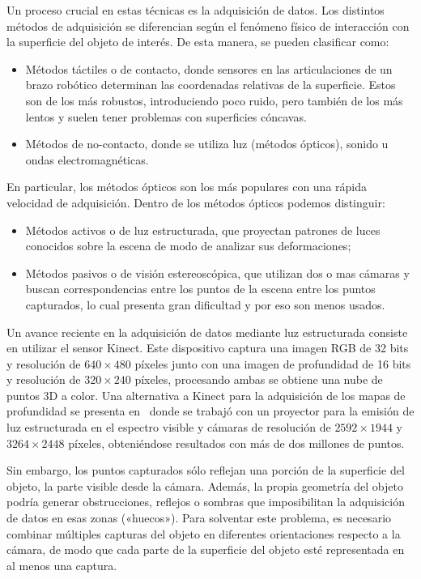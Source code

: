 	Un proceso crucial en estas técnicas es la adquisición de datos.
	Los distintos métodos de adquisición se diferencian según el fenómeno físico de interacción con la superficie del objeto de interés.
	De esta manera, se pueden clasificar como:
	\begin{itemize}
		\item Métodos táctiles o de contacto, donde sensores en las articulaciones de un brazo robótico determinan las coordenadas relativas de la superficie. Estos son de los más robustos, introduciendo poco ruido, pero también de los más lentos y suelen tener problemas con superficies cóncavas.
		\item Métodos de no-contacto, donde se utiliza luz (métodos ópticos), sonido u ondas electromagnéticas.
	\end{itemize}
	En particular, los métodos ópticos son los más populares con una rápida velocidad de adquisición\cite{Várady97reverseengineering}. %
	Dentro de los métodos ópticos podemos distinguir:
	\begin{itemize}
		\item Métodos activos o de luz estructurada,
			que proyectan patrones de luces conocidos sobre la escena de modo de analizar sus deformaciones;
		\item Métodos pasivos o de visión estereoscópica,
			que utilizan dos o mas cámaras y buscan correspondencias
			entre los puntos de la escena entre los puntos capturados,
			lo cual presenta gran dificultad y por eso son menos usados\cite{Várady97reverseengineering}.%
	\end{itemize}

	Un avance reciente en la adquisición de datos mediante luz estructurada consiste en utilizar el sensor Kinect.
	Este dispositivo captura una imagen RGB de 32 bits y resolución de $640 \times 480$ píxeles
	junto con una imagen de profundidad de 16 bits y resolución de $320 \times 240$ píxeles\cite{MatheEstudioKinect}, %
	procesando ambas se obtiene una nube de puntos 3D a color. %
	Una alternativa a Kinect para la adquisición de los mapas de profundidad se presenta en~\cite{Pancho}
	donde se trabajó con un proyector para la emisión de luz estructurada en el espectro visible y cámaras de resolución de $2592 \times 1944$ y $3264 \times 2448$ píxeles,
	obteniéndose resultados con más de dos millones de puntos.

	Sin embargo, los puntos capturados sólo reflejan una porción de la superficie del objeto,
	la parte visible desde la cámara.
	Además, la propia geometría del objeto podría generar obstrucciones, reflejos o sombras
	que imposibilitan la adquisición de datos en esas zonas («huecos»).
	Para solventar este problema, es necesario combinar múltiples capturas
	del objeto en diferentes orientaciones respecto a la cámara, de modo que
	cada parte de la superficie del objeto esté representada en al menos una captura.

